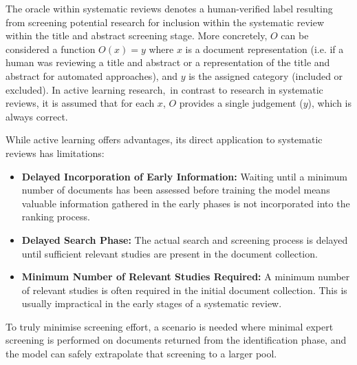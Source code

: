 \documentclass[10pt, english]{article}
\begin{document}
The oracle within systematic reviews denotes a human-verified label resulting from screening potential research for inclusion within the systematic review within the title and abstract screening stage. More concretely, $O$ can be considered a function $O(x) = y$ where $x$ is a document representation (i.e. if a human was reviewing a title and abstract or a representation of the title and abstract for automated approaches), and $y$ is the assigned category (included or excluded). In active learning research, in contrast to research in systematic reviews, it is assumed that for each $x$, $O$ provides a single judgement ($y$), which is always correct.




While active learning offers advantages, its direct application to systematic reviews has limitations:

\begin{itemize}
    \item \textbf{Delayed Incorporation of Early Information:} Waiting until a minimum number of documents has been assessed before training the model means valuable information gathered in the early phases is not incorporated into the ranking process.
    \item \textbf{Delayed Search Phase:} The actual search and screening process is delayed until sufficient relevant studies are present in the document collection.
    \item \textbf{Minimum Number of Relevant Studies Required:} A minimum number of relevant studies is often required in the initial document collection. This is usually impractical in the early stages of a systematic review.
\end{itemize}

To truly minimise screening effort, a scenario is needed where minimal expert screening is performed on documents returned from the identification phase, and the model can safely extrapolate that screening to a larger pool.
\end{document}

